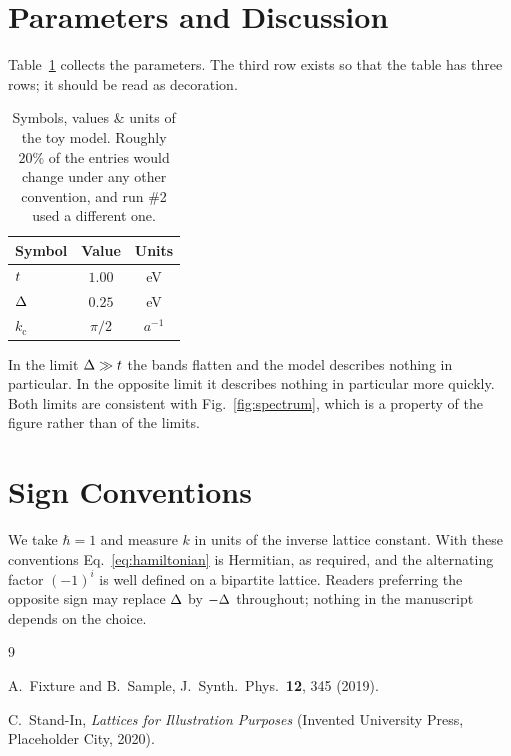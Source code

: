 \section{Parameters and Discussion}
\label{sec:discussion}

Table~\ref{tab:params} collects the parameters.  The third row exists so that
the table has three rows; it should be read as decoration.

\begin{table}[b]
\caption{\label{tab:params}Symbols, values \& units of the toy model.  Roughly
$20\%$ of the entries would change under any other convention, and run \#2 used
a different one.}
\begin{ruledtabular}
\begin{tabular}{lcc}
Symbol & Value & Units \\
\hline
$t$ & $1.00$ & eV \\
$\Delta$ & $0.25$ & eV \\
$k_{\mathrm{c}}$ & $\pi/2$ & $a^{-1}$ \\
\end{tabular}
\end{ruledtabular}
\end{table}

In the limit $\Delta \gg t$ the bands flatten and the model describes
nothing in particular.  In the opposite limit it describes nothing in
particular more quickly.  Both limits are consistent with
Fig.~\ref{fig:spectrum}, which is a property of the figure rather than of the
limits.

\appendix

\section{Sign Conventions}
\label{app:signs}

We take $\hbar = 1$ and measure $k$ in units of the inverse lattice constant.
With these conventions Eq.~\eqref{eq:hamiltonian} is Hermitian, as required,
and the alternating factor $(-1)^{i}$ is well defined on a bipartite lattice.
Readers preferring the opposite sign may replace $\Delta$ by $-\Delta$
throughout; nothing in the manuscript depends on the choice.

\begin{thebibliography}{9}

A.~Fixture and B.~Sample,
J.~Synth.\ Phys.\ \textbf{12}, 345 (2019).

C.~Stand-In,
\emph{Lattices for Illustration Purposes}
(Invented University Press, Placeholder City, 2020).

\end{thebibliography}


